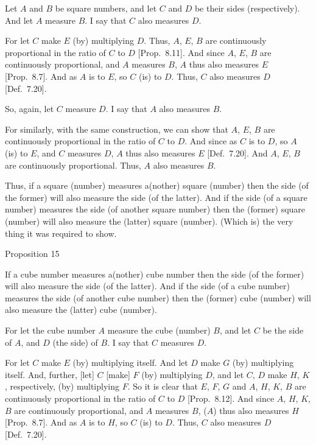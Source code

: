 Let $A$ and $B$ be square numbers, and let $C$ and $D$ be their sides (respectively). And let $A$ measure $B$. I say that $C$ also measures $D$.

\epsfysize=1in
\centerline{}

For let $C$ make $E$ (by) multiplying $D$. Thus, $A$, $E$, $B$
are continuously proportional in the ratio of $C$ to $D$
[Prop.~8.11]. And since $A$, $E$, $B$ are
continuously proportional, and $A$ measures $B$, $A$ thus also
measures $E$ [Prop.~8.7]. And as $A$ is to $E$,
so $C$ (is) to $D$. Thus, $C$ also measures $D$ [Def.~7.20].

So, again, let $C$ measure $D$. I say that $A$ also measures $B$.

For similarly, with the same construction, we can show that $A$, $E$, $B$
are continuously proportional in the ratio of $C$ to $D$. And since as $C$
is to $D$, so $A$ (is) to $E$, and $C$ measures $D$, $A$ thus
also measures $E$ [Def.~7.20]. And $A$, $E$,
$B$ are continuously proportional. Thus, $A$ also measures $B$.

Thus, if a square (number) measures a(nother) square
(number) then the side (of the former) will also measure the
side (of the latter). And if the side (of a square number) measures the side
(of another square number) then the (former) square (number) will also
measure the (latter) square (number). (Which is) the very thing it was
required to show.


\begin{center}
{\large Proposition 15}
\end{center}

If a cube number measures a(nother) cube
number then the side (of the former) will also measure the side (of the latter).
And if the side (of a cube number) measures the side (of another cube
number) then the (former) cube (number) will also measure the (latter)
cube (number).

For let the cube number $A$ measure the cube (number) $B$, and let
$C$ be the side of $A$, and $D$ (the side) of $B$. I say that $C$ measures $D$.

\epsfysize=1.7in
\centerline{}

For let $C$ make $E$ (by) multiplying itself. And let $D$ make $G$ (by)
multiplying itself. And, further, [let] $C$ [make] $F$ (by) multiplying
$D$,  and let  $C$, $D$ make  $H$, $K$, respectively, (by) multiplying
$F$. So it is clear that $E$, $F$, $G$ and $A$, $H$, $K$, $B$ are continuously proportional in the ratio of $C$ to $D$ [Prop.~8.12]. And since $A$, $H$, $K$, $B$ are
continuously proportional, and $A$ measures $B$, ($A$) thus also
measures $H$ [Prop.~8.7]. And as $A$ is to
$H$, so $C$ (is) to $D$. Thus, $C$ also measures $D$ [Def.~7.20].

